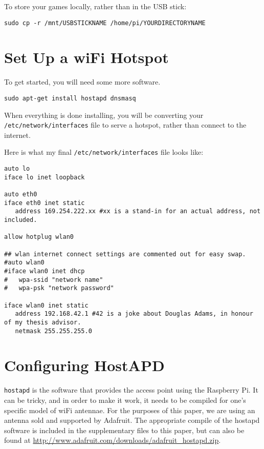 To store your games locally, rather than in the USB stick:
\begin{lstlisting}
sudo cp -r /mnt/USBSTICKNAME /home/pi/YOURDIRECTORYNAME
\end{lstlisting}

\section{Set Up a wiFi Hotspot}
To get started, you will need some more software.

\begin{lstlisting}
sudo apt-get install hostapd dnsmasq
\end{lstlisting}

When everything is done installing, you will be converting your \texttt{/etc/network/interfaces} file to serve a hotspot, rather than connect to the internet. 

Here is what my final \texttt{/etc/network/interfaces} file looks like:

\begin{lstlisting}
auto lo
iface lo inet loopback

auto eth0
iface eth0 inet static
   address 169.254.222.xx #xx is a stand-in for an actual address, not included.

allow hotplug wlan0

## wlan internet connect settings are commented out for easy swap.
#auto wlan0
#iface wlan0 inet dhcp
#   wpa-ssid "network name"
#   wpa-psk "network password"

iface wlan0 inet static
   address 192.168.42.1 #42 is a joke about Douglas Adams, in honour of my thesis advisor.
   netmask 255.255.255.0

\end{lstlisting}

\section{Configuring HostAPD}
\texttt{hostapd} is the software that provides the access point using the Raspberry Pi. It can be tricky, and in order to make it work, it needs to be compiled for one's specific model of wiFi antennae. For the purposes of this paper, we are using an antenna sold and supported by Adafruit. The appropriate compile of the hostapd software is included in the supplementary files to this paper, but can also be found at \url{http://www.adafruit.com/downloads/adafruit_hostapd.zip}.

